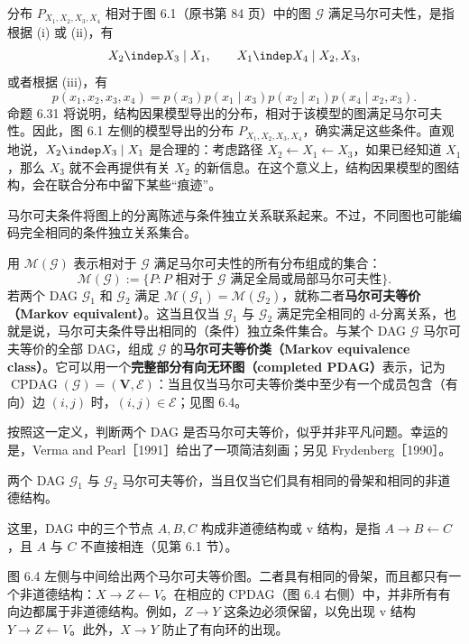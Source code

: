 \begin{example}
分布 $P_{X_1,X_2,X_3,X_4}$ 相对于图 6.1（原书第 84 页）中的图 $\mathcal G$ 满足马尔可夫性，是指根据 (i) 或 (ii)，有
\[
 X_2\indep X_3\mid X_1,
 \qquad X_1\indep X_4\mid X_2,X_3,
\]
或者根据 (iii)，有
\[
 p(x_1,x_2,x_3,x_4)
 =p(x_3)p(x_1\mid x_3)p(x_2\mid x_1)p(x_4\mid x_2,x_3).
\]
命题 6.31 将说明，结构因果模型导出的分布，相对于该模型的图满足马尔可夫性。因此，图 6.1 左侧的模型导出的分布 $P_{X_1,X_2,X_3,X_4}$，确实满足这些条件。直观地说，$X_2\indep X_3\mid X_1$ 是合理的：考虑路径 $X_2\leftarrow X_1\leftarrow X_3$，如果已经知道 $X_1$，那么 $X_3$ 就不会再提供有关 $X_2$ 的新信息。在这个意义上，结构因果模型的图结构，会在联合分布中留下某些“痕迹”。
\end{example}

马尔可夫条件将图上的分离陈述与条件独立关系联系起来。不过，不同图也可能编码完全相同的条件独立关系集合。

\begin{definition}[图的马尔可夫等价性]
用 $\mathcal M(\mathcal G)$ 表示相对于 $\mathcal G$ 满足马尔可夫性的所有分布组成的集合：
\[
 \mathcal M(\mathcal G)
 :=\{P:P\text{ 相对于 }\mathcal G\text{ 满足全局或局部马尔可夫性}\}.
\]
若两个 DAG $\mathcal G_1$ 和 $\mathcal G_2$ 满足 $\mathcal M(\mathcal G_1)=\mathcal M(\mathcal G_2)$，就称二者\textbf{马尔可夫等价（Markov equivalent）}。这当且仅当 $\mathcal G_1$ 与 $\mathcal G_2$ 满足完全相同的 d-分离关系，也就是说，马尔可夫条件导出相同的（条件）独立条件集合。与某个 DAG $\mathcal G$ 马尔可夫等价的全部 DAG，组成 $\mathcal G$ 的\textbf{马尔可夫等价类（Markov equivalence class）}。它可以用一个\textbf{完整部分有向无环图（completed PDAG）}表示，记为 $\operatorname{CPDAG}(\mathcal G)=(\mathbf V,\mathcal E)$：当且仅当马尔可夫等价类中至少有一个成员包含（有向）边 $(i,j)$ 时，$(i,j)\in\mathcal E$；见图 6.4。
\end{definition}

按照这一定义，判断两个 DAG 是否马尔可夫等价，似乎并非平凡问题。幸运的是，Verma and Pearl［1991］给出了一项简洁刻画；另见 Frydenberg［1990］。

\begin{lemma}[马尔可夫等价的图判据]
两个 DAG $\mathcal G_1$ 与 $\mathcal G_2$ 马尔可夫等价，当且仅当它们具有相同的骨架和相同的非道德结构。
\end{lemma}

这里，DAG 中的三个节点 $A,B,C$ 构成非道德结构或 v 结构，是指 $A\to B\leftarrow C$，且 $A$ 与 $C$ 不直接相连（见第 6.1 节）。

图 6.4 左侧与中间给出两个马尔可夫等价图。二者具有相同的骨架，而且都只有一个非道德结构：$X\to Z\leftarrow V$。在相应的 CPDAG（图 6.4 右侧）中，并非所有有向边都属于非道德结构。例如，$Z\to Y$ 这条边必须保留，以免出现 v 结构 $Y\to Z\leftarrow V$。此外，$X\to Y$ 防止了有向环的出现。

